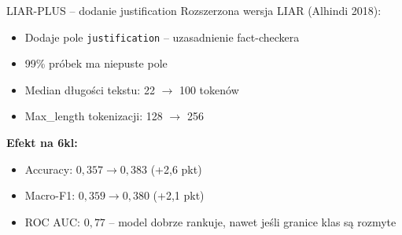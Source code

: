 \documentclass[10pt]{beamer}
\begin{document}
\begin{frame}{LIAR-PLUS -- dodanie justification}
  Rozszerzona wersja LIAR (Alhindi 2018):
  \begin{itemize}
    \item Dodaje pole \texttt{justification} -- uzasadnienie fact-checkera
    \item 99\% próbek ma niepuste pole
    \item Median długości tekstu: 22 $\to$ 100 tokenów
    \item Max\_length tokenizacji: 128 $\to$ 256
  \end{itemize}

  \vspace{0.5em}
  \textbf{Efekt na 6kl:}
  \begin{itemize}
    \item Accuracy: $0{,}357 \to 0{,}383$ (+2{,}6 pkt)
    \item Macro-F1: $0{,}359 \to 0{,}380$ (+2{,}1 pkt)
    \item ROC AUC: $0{,}77$ -- model dobrze rankuje, nawet jeśli granice klas są rozmyte
  \end{itemize}
\end{frame}
\end{document}
